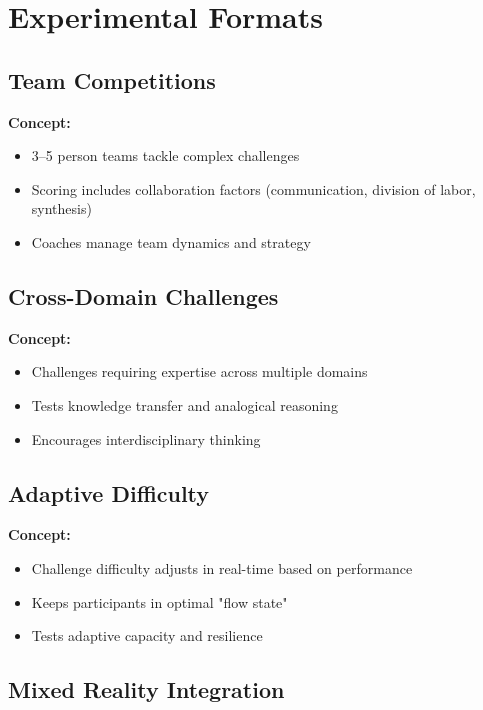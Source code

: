 \section{Experimental Formats}

\subsection{Team Competitions}

\textbf{Concept:}
\begin{itemize}[leftmargin=*]
  \item 3–5 person teams tackle complex challenges
  \item Scoring includes collaboration factors (communication, division of labor, synthesis)
  \item Coaches manage team dynamics and strategy
\end{itemize}

\subsection{Cross-Domain Challenges}

\textbf{Concept:}
\begin{itemize}[leftmargin=*]
  \item Challenges requiring expertise across multiple domains
  \item Tests knowledge transfer and analogical reasoning
  \item Encourages interdisciplinary thinking
\end{itemize}

\subsection{Adaptive Difficulty}

\textbf{Concept:}
\begin{itemize}[leftmargin=*]
  \item Challenge difficulty adjusts in real-time based on performance
  \item Keeps participants in optimal "flow state"
  \item Tests adaptive capacity and resilience
\end{itemize}

\subsection{Mixed Reality Integration}

